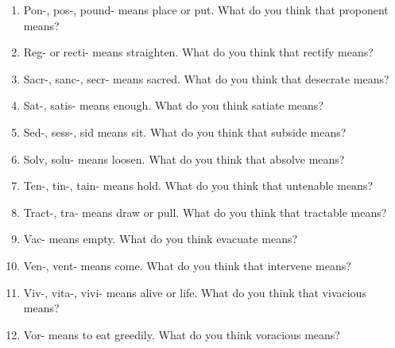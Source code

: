 \begin{spacing}{2}
\begin{enumerate}
\item Pon-, pos-, pound- means place or put. What do you think that proponent means?
\item Reg- or recti- means straighten. What do you think that rectify means?
\item Sacr-, sanc-, secr- means sacred. What do you think that desecrate means?
\item Sat-, satis- means enough. What do you think satiate means?
\item Sed-, sess-, sid means sit. What do you think that subside means?
\item Solv, solu- means loosen. What do you think that absolve means?
\item Ten-, tin-, tain- means hold. What do you think that untenable means?
\item Tract-, tra- means draw or pull. What do you think that tractable means?
\item Vac- means empty. What do you think evacuate means?
\item Ven-, vent- means come. What do you think that intervene means?
\item Viv-, vita-, vivi- means alive or life. What do you think that vivacious means?
\item Vor- means to eat greedily. What do you think voracious means?
\end{enumerate}
\end{spacing}